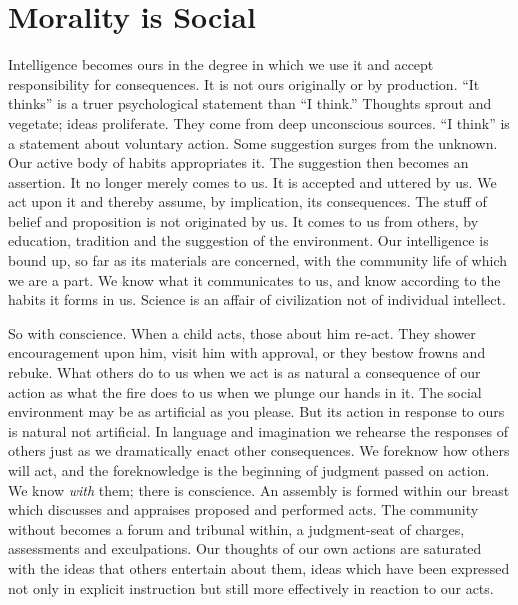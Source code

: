 
\author{John Dewey}
\chapter[John Dewey -- Morality is Social]{Morality is Social}


Intelligence becomes ours in the degree in which we use it
and accept responsibility for consequences. It is not ours originally
or by production. ``It thinks'' is a truer psychological statement
than ``I think.'' Thoughts sprout and vegetate; ideas proliferate.
They come from deep unconscious sources. ``I think'' is a statement
about voluntary action. Some suggestion surges from the unknown. Our
active body of habits appropriates it. The suggestion then becomes an
assertion. It no longer merely comes to us. It is accepted and uttered
by us. We act upon it and thereby assume, by implication, its
consequences. The stuff of belief and proposition is not originated by
us. It comes to us from others, by education, tradition and the
suggestion of the environment. Our intelligence is bound up, so far as
its materials are concerned, with the community life of which we are a
part. We know what it communicates to us, and know according to the
habits it forms in us. Science is an affair of civilization not of
individual intellect.

So with conscience. When a child acts, those about him re-act. They
shower encouragement upon him, visit him with approval, or they bestow
frowns and rebuke. What others do	to us when we act is as natural a
consequence of our action as what the fire does  to us when
we plunge our hands in it. The social environment may be as artificial
as you please. But its action in response to ours is natural not
artificial. In language and imagination we rehearse the responses of
others just as we dramatically enact other consequences. We foreknow
how others will act, and the foreknowledge is the beginning of
judgment passed on action. We know \textit{with} them; there is
conscience. An assembly is formed within our breast which discusses
and appraises proposed and performed acts. The community without
becomes a forum and tribunal within, a judgment-seat of charges,
assessments and exculpations. Our thoughts of our own actions are
saturated with the ideas that others entertain about them, ideas which
have been expressed not only in explicit instruction but still more
effectively in reaction to our acts.


